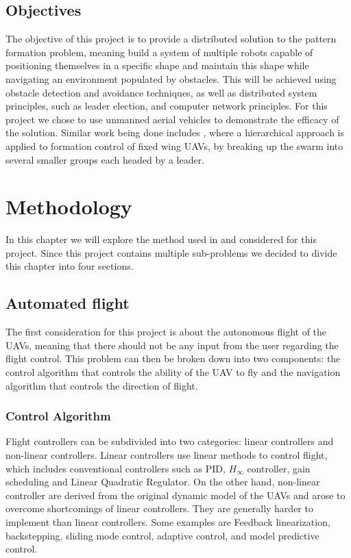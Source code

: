 \section{Objectives}

The objective of this project is to provide a distributed solution to the pattern formation problem, meaning
build a system of multiple robots capable of positioning themselves in a specific shape and maintain this
shape while navigating an environment populated by obstacles. This will be achieved using obstacle detection
and avoidance techniques, as well as distributed system principles, such as leader election, and computer
network principles. For this project we chose to use unmanned aerial vehicles to demonstrate the efficacy
of the solution. Similar work being done includes \autocite{HC21}, where a hierarchical approach is applied
to formation control of fixed wing UAVs, by breaking up the swarm into several smaller groups each headed by a 
leader.


\chapter{Methodology}

In this chapter we will explore the method used in and considered for this project. Since this project
contains multiple sub-problems we decided to divide this chapter into four sections.

\section{Automated flight}

The first consideration for this project is about the autonomous flight of the UAVs, meaning that there 
should not be any input from the user regarding the flight control. This problem can then be broken down
into two components: the control algorithm that controls the ability of the UAV to fly and the navigation
algorithm that controls the direction of flight.

\subsection{Control Algorithm}

Flight controllers can be subdivided into two categories: linear controllers and non-linear controllers.
Linear controllers use linear methods to control flight, which includes conventional controllers such as
PID, $H_{\infty}$ controller, gain scheduling and Linear Quadratic Regulator. On the other hand, non-linear controller
are derived from the original dynamic model of the UAVs and arose to overcome shortcomings of linear
controllers. They are generally harder to implement than linear controllers. Some examples are Feedback linearization, backstepping,
sliding mode control, adaptive control, and model predictive control. \autocite{NH20}

